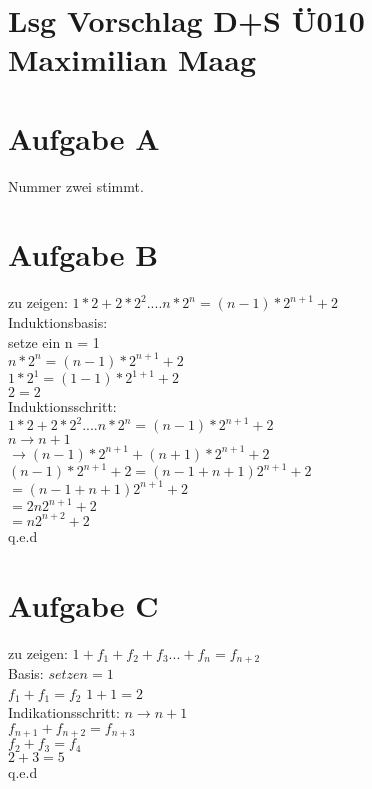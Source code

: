 \documentclass{article}
\begin{document}
	\section*{Lsg Vorschlag D+S Ü010 Maximilian Maag}
	\section*{Aufgabe A}
	Nummer zwei stimmt.
	\section*{Aufgabe B}
	
	zu zeigen: $1 * 2 + 2*2^2 .... n * 2^n = (n-1) * 2^{n+1} + 2$
	\\
 	Induktionsbasis: \\
 	setze ein n = 1 \\
 	$ n * 2^n = (n - 1) * 2^{n+1} + 2$ \\
 	$1 * 2^1 = (1 - 1) * 2^{1 + 1} + 2$ \\
 	$ 2 = 2 $ \\
 	Induktionsschritt: \\
 	$1 * 2 + 2*2^2 .... n * 2^n = (n-1) * 2^{n+1} + 2 $ \\
 	$n \to n+1$ \\
 	$\to (n-1) * 2^{n+1} + (n+1) * 2^{n+1} + 2$ \\
 	$(n-1) * 2^{n+1} + 2 = (n-1+n+1) 2^{n+1} + 2$ \\
 	$= (n-1+n+1) 2^{n+1} + 2$ \\
 	$= 2n 2^{n+1} + 2$ \\
 	$= n 2^{n+2} + 2$ \\
 	q.e.d
	\section*{Aufgabe C}
	zu zeigen: $1 + f_1 + f_2 + f_3 ... + f_n = f_{n+2}$ \\
	Basis: $setze n = 1$ \\
	$f_1 + f_1 = f_2$
	$1 + 1 = 2$ \\
	Indikationsschritt: $n \to n+1$ \\
	$f_{n+1} + f_{n+2} = f_{n+3}$ \\
	$f_{2} + f_{3} = f_4$ \\
	$2 + 3 = 5$ \\
	q.e.d
\end{document}
